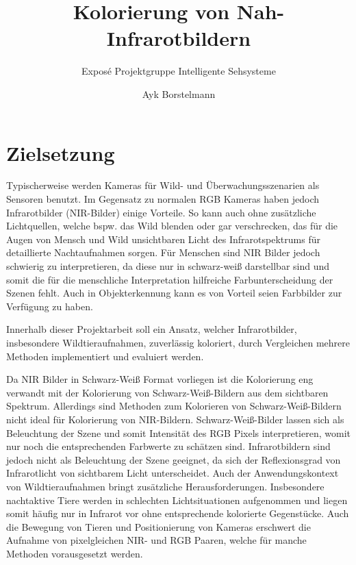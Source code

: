 \documentclass[runningheads]{llncs}
\begin{document}
\title{Kolorierung von Nah-Infrarotbildern}
\subtitle{Exposé Projektgruppe Intelligente Sehsysteme}
\author{Ayk Borstelmann}
\maketitle
%
%
%
\section{Zielsetzung}
Typischerweise werden Kameras für Wild- und Überwachungsszenarien als Sensoren benutzt.
Im Gegensatz zu normalen RGB Kameras haben jedoch Infrarotbilder (NIR-Bilder) einige Vorteile. 
So kann auch ohne zusätzliche Lichtquellen, welche bspw. das Wild blenden oder gar verschrecken, 
das für die Augen von Mensch und Wild unsichtbaren Licht des Infrarotspektrums für detaillierte Nachtaufnahmen sorgen. 
Für Menschen sind NIR Bilder jedoch schwierig zu interpretieren, da diese nur in schwarz-weiß darstellbar sind und 
somit die für die menschliche Interpretation hilfreiche Farbunterscheidung der Szenen fehlt. 
Auch in Objekterkennung kann es von Vorteil seien Farbbilder zur Verfügung zu haben.

Innerhalb dieser Projektarbeit soll ein Ansatz, welcher Infrarotbilder, insbesondere Wildtieraufnahmen, zuverlässig koloriert, durch Vergleichen mehrere Methoden
implementiert und evaluiert werden. 

Da NIR Bilder in Schwarz-Weiß Format vorliegen ist die Kolorierung eng verwandt mit der Kolorierung von Schwarz-Weiß-Bildern aus dem sichtbaren Spektrum.
Allerdings sind Methoden zum Kolorieren von Schwarz-Weiß-Bildern nicht ideal für Kolorierung von NIR-Bildern. 
Schwarz-Weiß-Bilder lassen sich als Beleuchtung der Szene und somit Intensität des RGB Pixels interpretieren, womit nur noch die entsprechenden Farbwerte zu schätzen sind. 
Infrarotbildern sind jedoch nicht als Beleuchtung der Szene geeignet, da sich der Reflexionsgrad von Infrarotlicht von sichtbarem Licht unterscheidet. 
Auch der Anwendungskontext von Wildtieraufnahmen bringt zusätzliche Herausforderungen. 
Insbesondere nachtaktive Tiere werden in schlechten Lichtsituationen aufgenommen und liegen somit häufig nur in Infrarot vor ohne entsprechende kolorierte Gegenstücke.
Auch die Bewegung von Tieren und Positionierung von Kameras erschwert die Aufnahme von pixelgleichen NIR- und RGB Paaren, welche für manche Methoden vorausgesetzt werden.   
\end{document}
